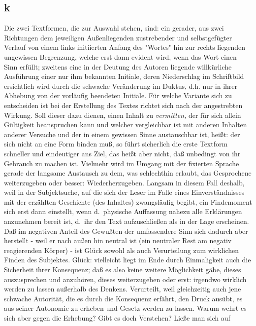 \documentclass[
]{article}
\author{}
\date{\vspace{-2.5em}}
\begin{document}
\subsection{k}\label{k}

Die zwei Textformen, die zur Auswahl stehen, sind: ein gerader, aus zwei
Richtungen dem jeweiligen Außenliegenden zustrebender und selbstgefügter
Verlauf von einem links initiierten Anfang des "Wortes" hin zur rechts
liegenden ungewissen Begrenzung, welche erst dann evident wird, wenn das
Wort einen Sinn erfüllt; zweitens eine in der Deutung des Autoren
liegende willkürliche Ausführung einer nur ihm bekannten Initiale, deren
Niederschlag im Schriftbild ersichtlich wird durch die schwache
Veränderung im Duktus, d.h. nur in ihrer Abhebung von der vorläufig
beendeten Initiale. Für welche Variante sich zu entscheiden ist bei der
Erstellung des Textes richtet sich nach der angestrebten Wirkung. Soll
dieser dazu dienen, einen Inhalt zu \emph{vermitten,} der für sich
allein Gültigkeit beanspruchen kann und welcher vergleichbar ist mit
anderen Inhalten anderer Versuche und der in einem gewissen Sinne
austauschbar ist, heißt: der sich nicht an eine Form binden muß, so
führt sicherlich die erste Textform schneller und eindeutiger ans Ziel,
das heißt aber nicht, daß unbedingt von ihr Gebrauch zu machen ist.
Vielmehr wird im Umgang mit der fixierten Sprache gerade der langsame
Austausch zu dem, was schlechthin erlaubt, das Gesprochene weiterzugeben
oder besser: Wiederherzugeben. Langsam in diesem Fall deshalb, weil in
der Subjektsuche, auf die sich der Leser im Falle eines
Einverständnisses mit der erzählten Geschichte (des Inhaltes)
zwangsläufig begibt, ein Findemoment sich erst dann einstellt, wenn
d.~physische Auffassung nahezu alle Erklärungen anzunehmen bereit ist,
d.~ihr den Text aufzuschließen als in der Lage erscheinen. Daß im
negativen Anteil des Gewußten der umfassendere Sinn sich dadurch aber
herstellt - weil er nach außen hin neutral ist (ein neutraler Rest am
negativ reagierenden Körper) - ist Glück sowohl als auch Verurteilung
zum wirklichen Finden des Subjektes. Glück: vielleicht liegt im Ende
durch Einmaligkeit auch die Sicherheit ihrer Konsequenz; daß es also
keine weitere Möglichkeit gäbe, dieses auszusprechen und anzuhören,
dieses weiterzugeben oder erst: irgendwo wirklich werden zu lassen
außerhalb des Denkens. Verurteilt, weil gleichzeitig auch jene schwache
Autorität, die es durch die Konsequenz erfährt, den Druck ausübt, es aus
seiner Autonomie zu erheben und Gesetz werden zu lassen. Warum wehrt es
sich aber gegen die Erhebung? Gibt es doch Verstehen? Ließe man sich auf
\end{document}
